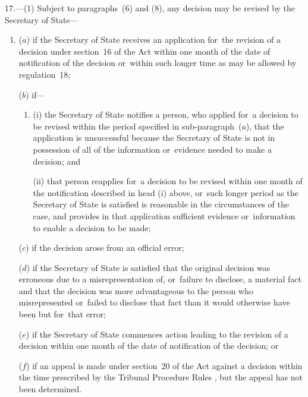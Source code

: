 \documentclass[a4paper,12pt]{article}
\begin{document}
17.—(1) Subject to paragraphs~(6) and (8), any decision may be revised by the Secretary of State---
\begin{enumerate}\item[]
($a$) if the Secretary of State receives an application for~the revision of a decision under section~16 of the Act within one month of the date of notification of the decision or~within such longer time as may be allowed by regulation~18;

($b$) if---
\begin{enumerate}\item[]
(i) the Secretary of State notifies a person, who applied for~a decision to be revised within the period specified in sub-paragraph~($a$), that the application is unsuccessful because the Secretary of State is not in possession of all of the information or~evidence needed to make a decision; and

(ii) that person reapplies for~a decision to be revised within one month of the notification described in head (i) above, or~such longer period as the Secretary of State is satisfied is reasonable in the circumstances of the case, and provides in that application sufficient evidence or~information to enable a decision to be made;
\end{enumerate}

($c$) if the decision arose from an official error;

($d$) if the Secretary of State is satisfied that the original decision was erroneous due to a misrepresentation of, or~failure to disclose, a material fact and that the decision was more advantageous to the person who misrepresented or~failed to disclose that fact than it would otherwise have been but for~that error; 

($e$) if the Secretary of State commences action leading to the revision of a decision within one month of the date of notification of the decision;
%
or

    ($f$) 
    if an appeal is made under section~20 of the Act against a decision within the time prescribed 
by the Tribunal Procedure Rules%
, but the appeal has not been determined.
\end{enumerate}
\end{document}
